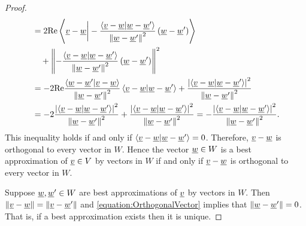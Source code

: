 \begin{proof}
\begin{equation}
\begin{split}
&= 2 \mathrm{Re} \left\langle \underline{v} - \underline{w} \bigg| - \frac{ \left\langle \underline{v} - \underline{w} | \underline{w} - \underline{w}' \right\rangle }{ \left\| \underline{w} - \underline{w}' \right\|^2 } \left( \underline{w} - \underline{w}' \right) \right\rangle \\
&\quad + \left\| - \frac{ \left\langle \underline{v} - \underline{w} | \underline{w} - \underline{w}' \right\rangle }{ \left\| \underline{w} - \underline{w}' \right\|^2 } \left( \underline{w} - \underline{w}' \right) \right\|^2 \\
&= - 2 \mathrm{Re} \frac{ \left\langle \underline{w} - \underline{w}' | \underline{v} - \underline{w} \right\rangle }{ \left\| \underline{w} - \underline{w}' \right\|^2 }
\left\langle \underline{v} - \underline{w} | \underline{w} - \underline{w}' \right\rangle
+ \frac{\left| \left\langle \underline{v} - \underline{w} | \underline{w} - \underline{w}' \right\rangle \right|^2}{ \left\| \underline{w} - \underline{w}' \right\|^2 } \\
&= - 2 \frac{ \left| \left\langle \underline{v} - \underline{w} | \underline{w} - \underline{w}' \right\rangle \right|^2 }{ \left\| \underline{w} - \underline{w}' \right\|^2 }
+ \frac{ \left| \left\langle \underline{v} - \underline{w} | \underline{w} - \underline{w}' \right\rangle \right|^2 }{ \left\| \underline{w} - \underline{w}' \right\|^2 }
= - \frac{ \left| \left\langle \underline{v} - \underline{w} | \underline{w} - \underline{w}' \right\rangle \right|^2 }{ \left\| \underline{w} - \underline{w}' \right\|^2 } .
\end{split}
\end{equation}
This inequality holds if and only if $\left\langle \underline{v} - \underline{w} | \underline{w} - \underline{w}' \right\rangle = 0$.
Therefore, $\underline{v} - \underline{w}$ is orthogonal to every vector in $W$.
Hence the vector $\underline{w} \in W$ is a best approximation of $\underline{v} \in V$ by vectors in $W$ if and only if $\underline{v} - \underline{w}$ is orthogonal to every vector in $W$.

Suppose $\underline{w}, \underline{w}' \in W$ are best approximations of $\underline{v}$ by vectors in $W$.
Then $\left\| \underline{v} - \underline{w} \right\| = \left\| \underline{v} - \underline{w}' \right\|$ and \eqref{equation:OrthogonalVector} implies that $\left\| \underline{w} - \underline{w}' \right\| = 0$.
That is, if a best approximation exists then it is unique.


\end{proof}
